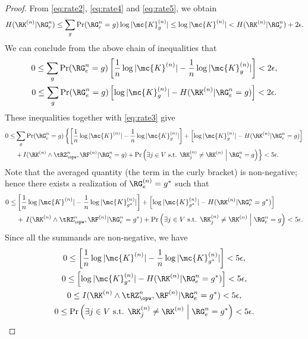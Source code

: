 \begin{proof}
From \eqref{eq:rate2}, \eqref{eq:rate4} and \eqref{eq:rate5}, we obtain
\begin{gather*}
    H(\RK^{(n)}|\RG^n_e)\leq \sum_{g}\Pr(\RG_e^n=g) \log|\mc{K}^{(n)}_g|\leq \log|\mc{K}^{(n)}| < H(\RK^{(n)}|\RG^n_e)+2\epsilon.
\end{gather*}
We can conclude from the above chain of inequalities that 
\begin{gather*}
    0\leq \sum_{g}\Pr(\RG_e^n=g)\left[\frac{1}{n} \log|\mc{K}^{(n)}|-\frac{1}{n} \log|\mc{K}^{(n)}_g|\right]< 2\epsilon,\\
    0\leq \sum_{g}\Pr(\RG_e^n=g)\left[ \log|\mc{K}_g^{(n)}|-H(\RK^{(n)}|\RG^n_e=g)\right]< 2\epsilon.
\end{gather*}
These inequalities together with \eqref{eq:rate3} give
\begin{align*}
    0\leq &\sum_{g}\Pr(\RG_e^n=g)\left\lbrace\left[\frac{1}{n} \log|\mc{K}^{(n)}|-\frac{1}{n} \log|\mc{K}^{(n)}_g|\right]+\left[ \log|\mc{K}_g^{(n)}|-H(\RK^{(n)}|\RG^n_e=g)\right]\right. \\ &\left.+\, I(\RK^{(n)}\wedge\tRZ^n_{\opw},\RF^{(n)}|\RG^n_e=g)+\Pr\left( \exists j\in V \text{ s.t. } \RK_j^{(n)}\neq \RK^{(n)}\Bigm\vert \RG^n_e=g\right)\right\rbrace < 5\epsilon.
\end{align*}
Note that the averaged quantity (the term in the curly bracket) is non-negative; hence there exists a realization of $\RG_e^{(n)}=g^*$ such that 
\begin{align*}
    0\leq &\left[\frac{1}{n} \log|\mc{K}^{(n)}|-\frac{1}{n} \log|\mc{K}^{(n)}_{g^*}|\right]+\left[ \log|\mc{K}_{g^*}^{(n)}|-H(\RK^{(n)}|\RG^n_e={g^*})\right]\\ &+\,I(\RK^{(n)}\wedge\tRZ^n_{\opw},\RF^{(n)}|\RG^n_e={g^*})+\Pr\left( \exists j\in V \text{ s.t. } \RK_j^{(n)}\neq \RK^{(n)}\Bigm\vert \RG^n_e=g\right) < 5\epsilon.
\end{align*}
Since all the summands are non-negative, we have 
\begin{subequations}
\label{eq:rate6}
\begin{gather}
    0\leq \left[\frac{1}{n} \log|\mc{K}^{(n)}|-\frac{1}{n} \log|\mc{K}^{(n)}_{g^*}|\right]< 5\epsilon,\label{eq:rate7}\\
    0\leq \left[ \log|\mc{K}_{g^*}^{(n)}|-H(\RK^{(n)}|\RG^n_e={g^*})\right]< 5\epsilon,\label{eq:rate8}\\ 
    0\leq I(\RK^{(n)}\wedge\tRZ^n_{\opw},\RF^{(n)}|\RG^n_e={g^*}) < 5\epsilon,\label{eq:rate9}\\
    0\leq \Pr\left( \exists j\in V \text{ s.t. } \RK_j^{(n)}\neq \RK^{(n)}\Bigm\vert \RG^n_e=g^*\right) < 5\epsilon\label{eq:rate10}.

\end{gather}
\end{subequations}
\end{proof}
